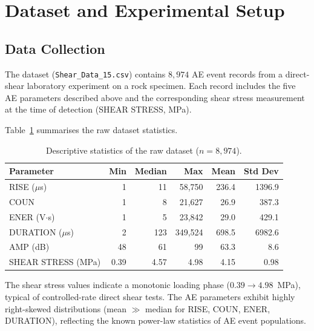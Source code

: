 \documentclass[12pt,a4paper]{article}
\begin{document}
\section{Dataset and Experimental Setup}
\label{sec:data}

\subsection{Data Collection}
\label{subsec:data_collection}

The dataset (\texttt{Shear\_Data\_15.csv}) contains $8{,}974$ AE event records
from a direct-shear laboratory experiment on a rock specimen. Each record
includes the five AE parameters described above and the corresponding shear
stress measurement at the time of detection (SHEAR STRESS, MPa).

Table~\ref{tab:descriptive} summarises the raw dataset statistics.

\begin{table}[H]
  \centering
  \caption{Descriptive statistics of the raw dataset ($n = 8{,}974$).}
  \label{tab:descriptive}
  \begin{tabular}{lrrrrr}
    \toprule
    \textbf{Parameter} & \textbf{Min} & \textbf{Median} & \textbf{Max}
      & \textbf{Mean} & \textbf{Std Dev} \\
    \midrule
    RISE ($\mu$s)        & 1    & 11    & 58{,}750   & 236.4  & 1396.9  \\
    COUN                 & 1    & 8     & 21{,}627   & 26.9   & 387.3   \\
    ENER (V$\cdot$s)     & 1    & 5     & 23{,}842   & 29.0   & 429.1   \\
    DURATION ($\mu$s)    & 2    & 123   & 349{,}524  & 698.5  & 6982.6  \\
    AMP (dB)             & 48   & 61    & 99         & 63.3   & 8.6     \\
    SHEAR STRESS (MPa)   & 0.39 & 4.57  & 4.98       & 4.15   & 0.98    \\
    \bottomrule
  \end{tabular}
\end{table}

The shear stress values indicate a monotonic loading phase
($0.39 \to 4.98$~MPa), typical of controlled-rate direct shear tests. The AE
parameters exhibit highly right-skewed distributions (mean $\gg$ median for
RISE, COUN, ENER, DURATION), reflecting the known power-law statistics of AE
event populations.
\end{document}
